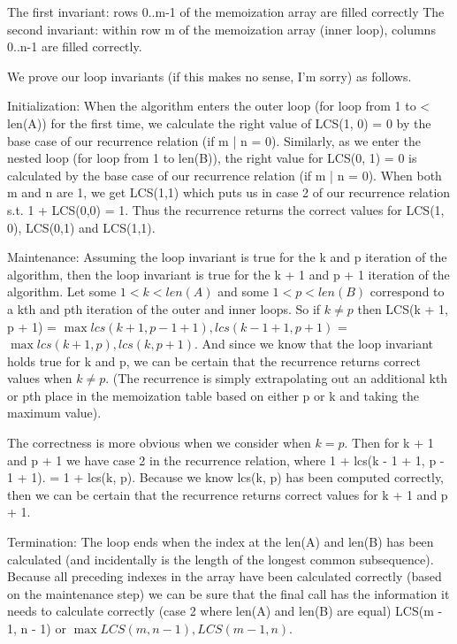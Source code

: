 \documentclass{article}
\begin{document}
The first invariant: rows 0..m-1 of the memoization array are filled correctly
The second invariant: within row m of the memoization array (inner loop), columns 0..n-1 are filled correctly. 

We prove our loop invariants (if this makes no sense, I'm sorry) as follows. 

Initialization: When the algorithm enters the outer loop (for loop from 1 to < len(A)) for the first time, we calculate the right value of LCS(1, 0) = 0 by the base case of our recurrence relation (if m | n = 0). Similarly, as we enter the nested loop (for loop from 1 to len(B)), the right value for LCS(0, 1) = 0 is calculated by the base case of our recurrence relation (if m | n = 0). When both m and n are 1, we get LCS(1,1) which puts us in case 2 of our recurrence relation s.t. 1 + LCS(0,0) = 1. Thus the recurrence returns the correct values for LCS(1, 0), LCS(0,1) and LCS(1,1). 

Maintenance: Assuming the loop invariant is true for the k and p iteration of the algorithm, then the loop invariant is true for the k + 1 and p + 1 iteration of the algorithm. Let some $1 < k < len(A)$ and some $1 < p < len(B)$ correspond to a kth and pth iteration of the outer and inner loops. So if $k \neq p$ then LCS(k + 1, p + 1) = $\max{lcs(k + 1, p - 1 + 1), lcs(k - 1 + 1, p + 1)}$ =  $\max{lcs(k + 1, p), lcs(k, p + 1)}.$ And since we know that the loop invariant holds true for k and p, we can be certain that the recurrence returns correct values when $k \neq p$. (The recurrence is simply extrapolating out an additional kth or pth place in the memoization table based on either p or k and taking the maximum value).  

The correctness is more obvious when we consider when $k = p$. Then for k + 1 and p + 1 we have case 2 in the recurrence relation, where 1 + lcs(k - 1 + 1, p - 1 + 1). = 1 + lcs(k, p). Because we know lcs(k, p) has been computed correctly, then we can be certain that the recurrence returns correct values for k + 1 and p + 1.  

Termination: The loop ends when the index at the len(A) and len(B) has been calculated (and incidentally is the length of the longest common subsequence). Because all preceding indexes in the array have been calculated correctly (based on the maintenance step) we can be sure that the final call has the information it needs to calculate correctly (case 2 where len(A) and len(B) are equal) LCS(m - 1, n - 1) or $\max{LCS(m, n - 1), LCS(m - 1, n)}$. 
\end{document}
